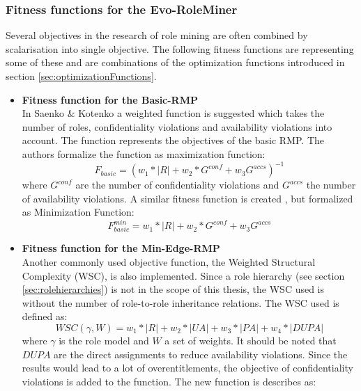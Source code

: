         \subsubsection{Fitness functions for the Evo-RoleMiner}
        Several objectives in the research of role mining are often combined by scalarisation into single objective. The following fitness functions are representing some of these and are combinations of the optimization functions introduced in section \ref{sec:optimizationFunctions}.
        \begin{itemize}
            \item \textbf{Fitness function for the Basic-RMP}\\
            In Saenko \& Kotenko\cite{saenko2012design} a weighted function is suggested which takes the number of roles, confidentiality violations and availability violations into account. The function represents the objectives of the basic RMP. The authors formalize the function as maximization function:
            \begin{equation}
                F_{basic} = (w_1 * |R| + w_2 * G^{conf} + w_3 G^{accs})^{-1}
            \end{equation}    
            where $G^{conf}$ are the number of confidentiality violations and $G^{accs}$ the number of availability violations. A similar fitness function is created , but formalized as Minimization Function:
            \begin{equation}
                F_{basic}^{min} = w_1 * |R| + w_2 * G^{conf} + w_3 G^{accs}
            \end{equation}
            \item \textbf{Fitness function for the Min-Edge-RMP}\\
            Another commonly used objective function, the Weighted Structural Complexity (WSC)\cite{Molloy}\cite{Xu}, is also implemented. Since a role hierarchy (see section \ref{sec:rolehierarchies}) is not in the scope of this thesis, the WSC used is without the number of role-to-role inheritance relations. The WSC used is defined as:
            \begin{equation}
                WSC(\gamma,W) = w_1 * |R| + w_2 * |UA| + w_3 * |PA| + w_4 * |DUPA|
            \end{equation}
            where $\gamma$ is the role model and $W$ a set of weights. It should be noted that $DUPA$ are the direct assignments to reduce availability violations. Since the results would lead to a lot of overentitlements, the objective of confidentiality violations is added to the function. The new function is describes as:

\end{itemize}

